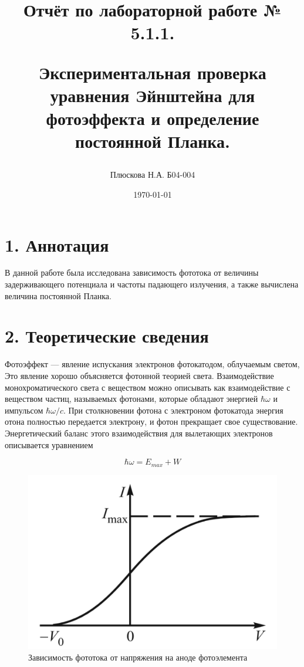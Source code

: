 \documentclass[a4paper,12pt]{report}
\title{Отчёт по лабораторной работе № 5.1.1. 

Экспериментальная проверка уравнения Эйнштейна для фотоэффекта и определение постоянной Планка.}
\author{Плюскова Н.А. Б04-004 }
\date{\today}
\begin{document}
\maketitle
\section*{1. Аннотация}
В данной работе была исследована зависимость фототока от величины задерживающего потенциала и частоты падающего излучения, а также вычислена величина постоянной Планка.


\section*{2. Теоретические сведения}

Фотоэффект --- явление испускания электронов фотокатодом, облучаемым светом,  Это явление хорошо объясняется фотонной теорией света. Взаимодействие монохроматического света с веществом можно описывать
	как взаимодействие с веществом частиц, называемых фотонами, которые обладают энергией $ \hbar \omega $ и импульсом $ \hbar\omega/c $. При столкновении фотона с электроном фотокатода энергия отона полностью передается электрону, и фотон прекращает свое существование. Энергетический баланс этого взаимодействия для вылетающих электронов
	описывается уравнением
	
	\begin{equation}\label{energy balance}
	\hbar \omega = E_{max} + W
	\end{equation}
	
	\begin{figure}
		\includegraphics[width=\linewidth]{I_V.png}
		\caption{Зависимость фототока от напряжения на аноде фотоэлемента}
		\label{ris I(V)}
	\end{figure}
	
\end{document}
